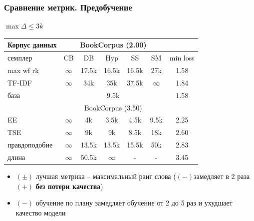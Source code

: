 \documentclass{beamer}
\begin{document}
\begin{frame}
	\frametitle{Сравнение метрик. Предобучение}
	$\max\Delta \le 3k$
	\begin{table}
		\begin{tabular}{l|ccccc|c}
			Корпус данных & \multicolumn{5}{c}{BookCorpus (2.00)}\\
			\hline
			семплер & CB & DB & Hyp & SS & SM & min loss\\
			\hline
			max wf rk & $\infty$ & 17.5k & 16.5k & 16.5k & 27k & 1.58 \\
			TF-IDF & $\infty$ & 34k & 35k & 37.5k & $\infty$ & 1.84 \\
			\hline
			база & \multicolumn{5}{c}{9.5k} & 1.58 \\
			\hline
			\hline
			& \multicolumn{5}{c}{BookCorpus (3.50)}\\
			\hline
			EE & $\infty$ & 4k & 3.5k & 4.5k & 9.5k & 2.25 \\
			TSE & $\infty$ & 9k & 9k & 8.5k & 18k & 2.60 \\
			правдоподобие & $\infty$ & 13.5k & 13.5k & 15.5k & 50k & 2.83 \\
			длина & $\infty$ & 50.5k & $\infty$ & - & - & 3.45 \\
			\hline
		\end{tabular}
	\end{table}
	\begin{itemize}
		\item {\bf\color{orange}$(\pm)$} лучшая метрика -- максимальный ранг слова ({\bf\color{red}$(-)$}замедляет в $2$ раза {\bf\color{green}$(+)$} {\bf без потери качества})
		\item {\bf\color{red}$(-)$} обучение по плану замедляет обучение от 2 до 5 раз и ухудшает качество модели
	\end{itemize}
\end{frame}
\end{document}
